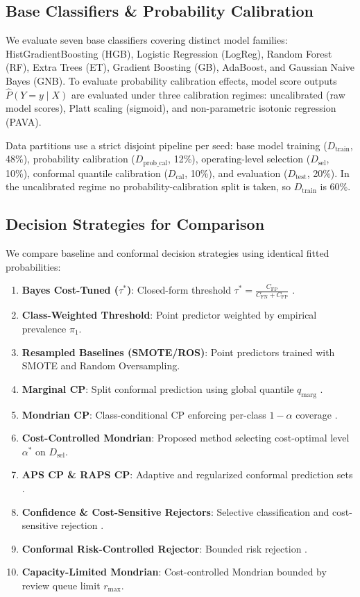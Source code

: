 \documentclass{ieeetj}
\begin{document}
\subsection{Base Classifiers \& Probability Calibration}
We evaluate seven base classifiers covering distinct model families: HistGradientBoosting (HGB), Logistic Regression (LogReg), Random Forest (RF), Extra Trees (ET), Gradient Boosting (GB), AdaBoost, and Gaussian Naive Bayes (GNB). To evaluate probability calibration effects, model score outputs $\hat{P}(Y=y \mid X)$ are evaluated under three calibration regimes: uncalibrated (raw model scores), Platt scaling (sigmoid), and non-parametric isotonic regression (PAVA).

Data partitions use a strict disjoint pipeline per seed: base model training ($D_{\mathrm{train}}$, 48\%), probability calibration ($D_{\mathrm{prob\_cal}}$, 12\%), operating-level selection ($D_{\mathrm{sel}}$, 10\%), conformal quantile calibration ($D_{\mathrm{cal}}$, 10\%), and evaluation ($D_{\mathrm{test}}$, 20\%). In the uncalibrated regime no probability-calibration split is taken, so $D_{\mathrm{train}}$ is 60\%.

\subsection{Decision Strategies for Comparison}
We compare baseline and conformal decision strategies using identical fitted probabilities:
\begin{enumerate}
    \item \textbf{Bayes Cost-Tuned ($\tau^*$)}: Closed-form threshold $\tau^* = \frac{C_{\mathrm{FP}}}{C_{\mathrm{FN}} + C_{\mathrm{FP}}}$ \cite{elkan2001foundations}.
    \item \textbf{Class-Weighted Threshold}: Point predictor weighted by empirical prevalence $\pi_1$.
    \item \textbf{Resampled Baselines (SMOTE/ROS)}: Point predictors trained with SMOTE and Random Oversampling.
    \item \textbf{Marginal CP}: Split conformal prediction using global quantile $q_{\mathrm{marg}}$ \cite{angelopoulos2021gentle}.
    \item \textbf{Mondrian CP}: Class-conditional CP enforcing per-class $1-\alpha$ coverage \cite{vovk2012conditional}.
    \item \textbf{Cost-Controlled Mondrian}: Proposed method selecting cost-optimal level $\alpha^*$ on $D_{\mathrm{sel}}$.
    \item \textbf{APS CP \& RAPS CP}: Adaptive and regularized conformal prediction sets \cite{romano2020classification, angelopoulos2021uncertainty}.
    \item \textbf{Confidence \& Cost-Sensitive Rejectors}: Selective classification and cost-sensitive rejection \cite{geifman2017selective, charoenphakdee2021rejection}.
    \item \textbf{Conformal Risk-Controlled Rejector}: Bounded risk rejection \cite{angelopoulos2024risk}.
    \item \textbf{Capacity-Limited Mondrian}: Cost-controlled Mondrian bounded by review queue limit $r_{\max}$.
\end{enumerate}
\end{document}
